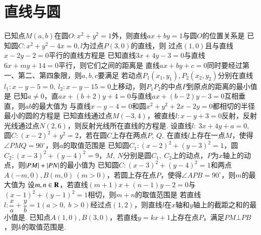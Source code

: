 \section{直线与圆}
\begin{questions}
\qs 已知点$ M(a,b) $在圆$ O:x^2+y^2=1 $外，则直线$ ax+by=1 $与圆$ O $的位置关系是\xx
{} 
\qs 已知圆$ C:x^2+y^2-4x=0 ,l$为过点$ P(3,0) $的直线，则\xx
{}
\qs 过点$\left(1,0\right)$且与直线$ x-2y-2=0 $平行的直线方程是\xx
{}
\qs 已知直线$ 3x+4y-3=0 $与直线$ 6x+my+14=0 $平行，则它们之间的距离是\xx
{}
\qs 直线$ ax+by+c=0 $同时要经过第一、第二、第四象限，则$ a,b,c $要满足\xx
{}
\qs 若动点$ P_1\left(x_1,y_1 \right),P_2\left(x_2,y_2\right) $分别在直线$ l_1:x-y-5=0 ,\ l_2:x-y-15=0$上移动，则$ P_1P_2 $的中点$ P $到原点的距离的最小值是\xx
{}
\qs 已知$ a\ne 0 $，直$ ax+(b+2)y+4=0 $与直线$ ax+(b-2)y-3=0 $互相垂直，则$ ab $的最大值为\xx
{}
\qs 与直线$ x-y-4=0 $和圆$ x^2+y^2+2x-2y=0 $都相切的半径最小的圆的方程是\xx
{}
\qs 已知直线通过点$ M\left(-3,4\right) $，被直线$ l:x-y+3=0 $反射，反射光线通过点$ N\left(2,6\right) $，则反射光线所在直线的方程是\tk.
\qs 设直线$ l:~3x+4y+a=0,~ $圆$ C:(x-2)^2+y^2=2 $，若在圆$ C $上存在两点$ P,~Q,~ $在直线$ l $上存在一点$ M $，使得$ \angle PMQ =90^{\circ}$，则$ a $的取值范围是\xx
{}
\qs 已知圆$ C_1:\left(x-2\right)^2+\left(y-3\right)^2=1 $，圆$ C_2:\left(x-3\right)^2+\left(y-4\right)^2=9 $，$ M,\ N $分别是圆$ C_1,\ C_2 $上的动点，$ P $为$x$轴上的动点，则$ \left| PM \right|+\left| PN \right| $的最小值为\xx
{}
\qs 已知圆$ C:(x-3)^2+(y-4)^2=1 $和两点$ A(-m,0),B(m,0)~(m>0) $，若圆上存在点$ P $，使得$ \angle APB=90^{\circ} $，则$ m $的最大值为\xx
{}
\qs 设$ m,n\in\mathbf{R} $，若直线$ (m+1)x+(n-1)y-2=0 $与$ \left(x-1\right)^2+\left(y-1\right)^2=1 $相切，则$ m+n $的取值范围是\xx
\twoch{$ \left[1-\sqrt{3},1+\sqrt{3}\right]$}{$ \left(-\infty,1-\sqrt{3}\right]\cup\left[1+\sqrt{3},+\infty\right)$}{$ \left[2-2\sqrt{2},2+2\sqrt{2}\right]$}{$ \left(-\infty,2-2\sqrt{2}\right]\cup\left[2+2\sqrt{2},+\infty\right)$}
\qs 若直线$ l:\dfrac{x}{a}+\dfrac{y}{b}=1\left(a>0,\; b>0\right) $经过点$ \left(1,2\right) $，则直线$ l $在$x$轴和$y$轴上的截距之和的最小值是\tk.
\qs 已知点$ A(1,0),B(3,0) $，若直线$ y=kx+1 $上存在点$ P $，满足$ PM\bot PB $，则$ k $的取值范围是\tk.

\end{questions}